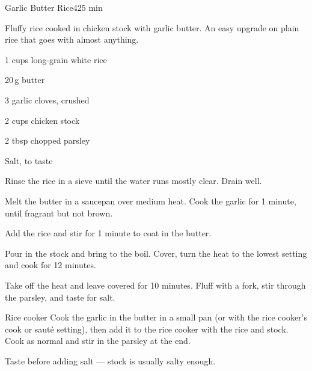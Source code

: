 \begin{recipebox}{Garlic Butter Rice}{4}{25 min}

Fluffy rice cooked in chicken stock with garlic butter. An easy upgrade on
plain rice that goes with almost anything.

\begin{ingredients}
  \item 1 cups long-grain white rice
  \item 20\,g butter
  \item 3 garlic cloves, crushed
  \item 2 cups chicken stock
  \item 2 tbsp chopped parsley
  \item Salt, to taste
\end{ingredients}

\begin{method}
  \item Rinse the rice in a sieve until the water runs mostly clear. Drain well.
  \item Melt the butter in a saucepan over medium heat. Cook the garlic for 1 minute, until fragrant but not brown.
  \item Add the rice and stir for 1 minute to coat in the butter.
  \item Pour in the stock and bring to the boil. Cover, turn the heat to the lowest setting and cook for 12 minutes.
  \item Take off the heat and leave covered for 10 minutes. Fluff with a fork, stir through the parsley, and taste for salt.
\end{method}

\begin{variationbox}{Rice cooker}
Cook the garlic in the butter in a small pan (or with the rice cooker's cook or sauté setting), then add it to the rice cooker with the rice and stock. Cook as normal and stir in the parsley at the end.
\end{variationbox}

\begin{notelist}
  \item Taste before adding salt --- stock is usually salty enough.
\end{notelist}

\end{recipebox}
